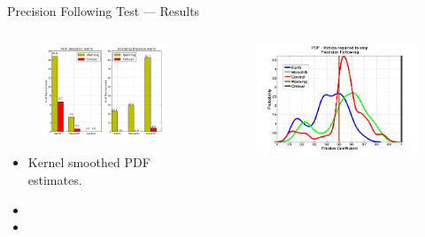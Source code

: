 \documentclass{beamer}
\begin{document}
    \begin{frame}{Precision Following Test --- Results}
      \begin{columns}
        \begin{column}{0.5\textwidth}
          \begin{figure}
            \includegraphics[width=\textwidth]{../graphics/precision_following_alert_percents.png}
          \end{figure}
          \begin{itemize}
            \item Kernel smoothed PDF estimates.
            \item 
            \item 
          \end{itemize}
        \end{column}
        \begin{column}{0.5\textwidth}
          \begin{figure}
            \includegraphics[width=\textwidth]{../graphics/precision_following_mu_distribution.png}

\end{figure}
\end{column}
\end{columns}
\end{frame}
\end{document}
